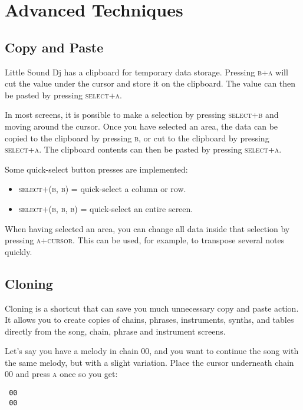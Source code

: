 \chapter{Advanced Techniques}

\section{Copy and Paste} \label{copy-paste}

Little Sound Dj has a clipboard for temporary data storage. Pressing \textsc{b+a} will cut the value
under the cursor and store it on the clipboard. The value can then be pasted by pressing
\textsc{select+a}.

In most screens, it is possible to make a selection by pressing \textsc{select+b} and moving around
the cursor. Once you have selected an area, the data can be copied to the clipboard by pressing \textsc{b},
or cut to the clipboard by pressing \textsc{select+a}. The clipboard contents can then be pasted by
pressing \textsc{select+a}.

Some quick-select button presses are implemented:
\begin{itemize}
\item \textsc{select+(b, b)} = quick-select a column or row.
\item \textsc{select+(b, b, b)} = quick-select an entire screen.
\end{itemize}

When having selected an area, you can change all data inside that selection by pressing \textsc{a+cursor}. This can be used, for example, to transpose several notes quickly.

\section{Cloning}

Cloning is a shortcut that can save you much unnecessary copy and paste action. It allows you to create copies of chains, phrases, instruments, synths, and tables directly from the song, chain, phrase and instrument screens.

Let's say you have a melody in chain 00, and you want to continue the song with the same melody, but with a slight variation. Place the cursor underneath chain 00 and press \textsc{a} once so you get:

\begin{verbatim}
 00
 00
\end{verbatim}

